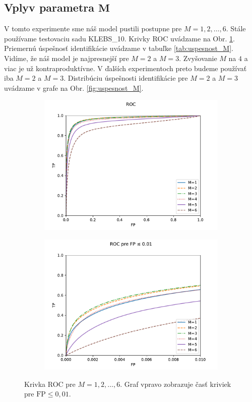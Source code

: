 \subsection[Vplyv parametra $M$]{Vplyv parametra $\boldsymbol{M}$}
V tomto experimente sme náš model pustili postupne pre $M = 1, 2, \dots, 6$. Stále používame testovaciu sadu KLEBS\_10.
Krivky ROC uvádzame na Obr. \ref{fig:ROC_M}. Priemernú úspešnosť identifikácie uvádzame v tabuľke \ref{tab:uspesnost_M}.
Vidíme, že náš model je najpresnejší pre $M=2$ a $M=3$. Zvyšovanie $M$ na $4$ a viac je už kontraproduktívne. V ďalších
experimentoch preto budeme používať iba $M=2$ a $M=3$. Distribúciu úspešnosti identifikácie pre $M = 2$ a $M = 3$ uvádzame
v grafe na Obr. \ref{fig:uspesnost_M}.

\begin{figure}[t]
\begin{subfigure}{0.5\textwidth}
\centerline{\includegraphics[width=\linewidth]{plots/4_ROC}}
\end{subfigure}%
\begin{subfigure}{0.5\textwidth}
\centerline{\includegraphics[width=\linewidth]{plots/4_ROC_zoom}}
\end{subfigure}
\caption{Krivka ROC pre $M = 1, 2, \dots, 6$. Graf vpravo zobrazuje časť kriviek pre $\mathrm{FP} \leq 0,01$.}
\label{fig:ROC_M}
\end{figure}

